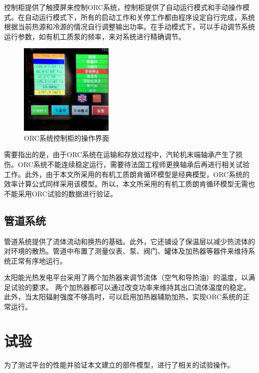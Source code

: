 控制柜提供了触摸屏来控制ORC系统，控制柜提供了自动运行模式和手动操作模式。在自动运行模式下，所有的启动工作和关停工作都由程序设定自行完成，系统根据当前热源和冷源的情况自行调整输出功率。在手动模式下，可以手动调节系统运行参数，如有机工质泵的频率，来对系统进行精确调节。

\begin{figure}[!ht]
\centering
\includegraphics[width=0.4\textwidth]{fig/ControlCabinet}
\caption{ORC系统控制柜的操作界面}\label{fig:ControlCabinet}
\end{figure}

需要指出的是，由于ORC系统在运输和存放过程中，汽轮机末端轴承产生了损伤。ORC系统不能连续稳定运行，需要待法国工程师更换轴承后再进行相关试验工作。此外，由于本文所采用的有机工质朗肯循环模型是经典模型，ORC系统的效率计算公式同样采用该模型。所以，本文所采用的有机工质朗肯循环模型无需也不能采用ORC试验的数据进行验证。

\subsection{管道系统}

管道系统提供了流体流动和换热的基础。此外，它还铺设了保温层以减少热流体的对环境的散热。管道中布置了测量仪表、泵、阀门、罐体及加热器等器件来维持系统正常有序地运行。

太阳能光热发电平台采用了两个加热器来调节流体（空气和导热油）的温度，以满足试验的要求。
两个加热器都可以通过改变功率来维持其出口流体温度的稳定。
此外，当太阳辐射强度不够高时，可以启用加热器辅助加热，实现ORC系统的正常运行。

\section{试验}

为了测试平台的性能并验证本文建立的部件模型，进行了相关的试验操作。

